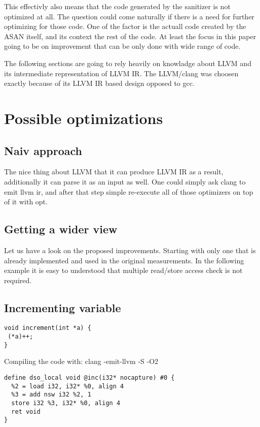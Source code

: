 \documentclass[letterpaper, 10 pt, conference]{IEEEtran}  %
\let\cite\parencite
\begin{document}
This effectivly also means that the code generated by the sanitizer is not optimized at all. The question could come naturally if there is a need for further optimizing for those code. One of the factor is the actuall code created by the ASAN itself, and its context the rest of the code. At least the focus in this paper going to be on improvement that can be only done with wide range of code.

The following sections are going to rely heavily on knowladge about LLVM\cite{lattner2008llvm} and its intermediate representation of LLVM IR\cite{llvm-ir}. The LLVM/clang was choosen exactly because of its LLVM IR based design opposed to gcc.

\section{Possible optimizations}

\subsection{Naiv approach}

The nice thing about LLVM that it can produce LLVM IR as a result, additionally it can parse it as an input as well. One could simply ask clang to emit llvm ir, and after that step simple re-execute all of those optimizers on top of it with opt.



\subsection{Getting a wider view}


Let us have a look on the proposed\cite{serebryany2012addresssanitizer} improvements. Starting with only one that is already implemented and used in the original measurements. In the following example it is easy to understood that multiple read/store access check is not required.

\subsection{Incrementing variable}

\begin{verbatim}
void increment(int *a) {
 (*a)++;
}
\end{verbatim}

Compiling the code with: clang -emit-llvm -S -O2
\begin{verbatim}
define dso_local void @inc(i32* nocapture) #0 {
  %2 = load i32, i32* %0, align 4
  %3 = add nsw i32 %2, 1
  store i32 %3, i32* %0, align 4
  ret void
}
\end{verbatim}
\end{document}
